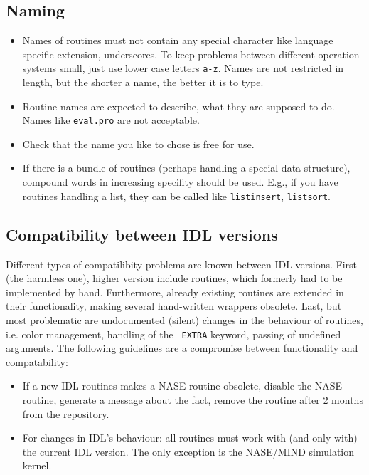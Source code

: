 \documentclass[12pt]{article}
\begin{document}
\subsection{Naming}
\begin{itemize}
\item Names of routines must not contain any special character like language specific extension, underscores. To keep problems between different operation systems small, just use lower case letters \texttt{a-z}. Names are not restricted in length, but the shorter a name, the better it is to type.  
\item Routine names are expected to describe, what they are supposed to do. Names like \texttt{eval.pro} are not acceptable.
\item Check that the name you like to chose is free for use.
\item If there is a bundle of routines (perhaps handling a special data structure), compound words in increasing specifity should be used. E.g., if you have routines handling a list, they can be called like \texttt{listinsert}, \texttt{listsort}.
\end{itemize}


\subsection{Compatibility between IDL versions}
Different types of compatilibity problems are known between IDL versions. First (the harmless one), higher version include routines, which formerly had to be implemented by hand. Furthermore, already existing routines are extended in their functionality, making several hand-written wrappers obsolete. Last, but most problematic are undocumented (silent) changes in the behaviour of routines, i.e. color management, handling of the \texttt{\_EXTRA} keyword, passing of undefined arguments. The following guidelines are a compromise between functionality and compatability:
\begin{itemize}
\item If a new IDL routines makes a NASE routine obsolete, disable the NASE routine, generate a message about the fact, remove the routine after 2 months from the repository.
\item For changes in IDL's behaviour: all routines must work with (and only with) the current IDL version. The only exception is the NASE/MIND simulation kernel.
\end{itemize}
\end{document}
